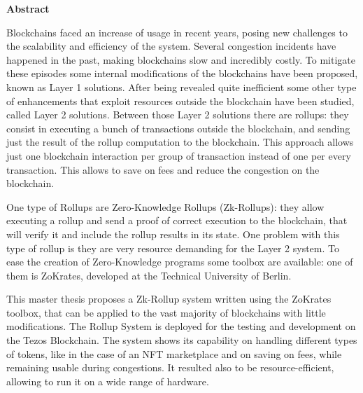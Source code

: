 \thispagestyle{empty}
\vspace*{1.0cm}

\begin{center}
    \textbf{Abstract}
\end{center}

\vspace*{0.5cm}

\noindent
Blockchains faced an increase of usage in recent years, posing new challenges to the scalability and efficiency of the system. Several congestion incidents have happened in the past, making blockchains slow and incredibly costly. To mitigate these episodes some internal modifications of the blockchains have been proposed, known as Layer 1 solutions. After being revealed quite inefficient some other type of enhancements that exploit resources outside the blockchain have been studied, called Layer 2 solutions. Between those Layer 2 solutions there are rollups: they consist in executing a bunch of transactions outside the blockchain, and sending just the result of the rollup computation to the blockchain. This approach allows just one blockchain interaction per group of transaction instead of one per every transaction. This allows to save on fees and reduce the congestion on the blockchain.

One type of Rollups are Zero-Knowledge Rollups (Zk-Rollups): they allow executing a rollup and send a proof of correct execution to the blockchain, that will verify it and include the rollup results in its state. One problem with this type of rollup is they are very resource demanding for the Layer 2 system. To ease the creation of Zero-Knowledge programs some toolbox are available: one of them is ZoKrates, developed at the Technical University of Berlin.

This master thesis proposes a Zk-Rollup system written using the ZoKrates toolbox, that can be applied to the vast majority of blockchains with little modifications. The Rollup System is deployed for the testing and development on the Tezos Blockchain. The system shows its capability on handling different types of tokens, like in the case of an NFT marketplace and on saving on fees, while remaining usable during congestions. It resulted also to be resource-efficient, allowing to run it on a wide range of hardware.



